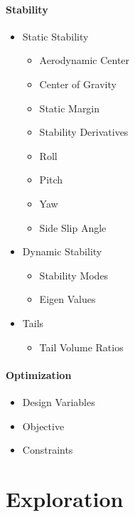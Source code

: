 \documentclass[11pt,twocolumn]{article}
\begin{document}
\paragraph{Stability}
\begin{itemize}
	\item Static Stability
	\begin{itemize}
		\item Aerodynamic Center
		\item Center of Gravity
		\item Static Margin
		\item Stability Derivatives
		\item Roll
		\item Pitch
		\item Yaw
		\item Side Slip Angle
	\end{itemize}
	\item Dynamic Stability
	\begin{itemize}
		\item Stability Modes
		\item Eigen Values
	\end{itemize}
	\item Tails
	\begin{itemize}
		\item Tail Volume Ratios
	\end{itemize}
\end{itemize}

\paragraph{Optimization}
\begin{itemize}
	\item Design Variables
	\item Objective
	\item Constraints
\end{itemize}

\newpage



\newpage
\section{Exploration}
\label{sec:exploration}
\end{document}
